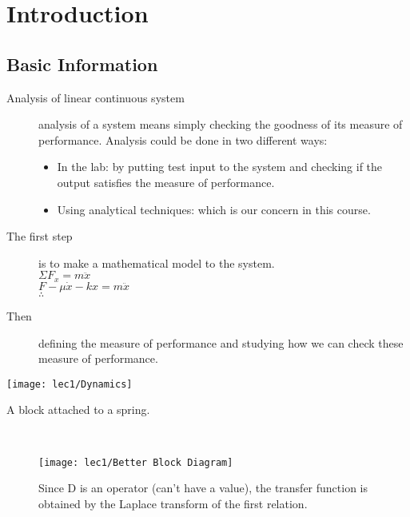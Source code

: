 \setchapterpreamble[u]{\margintoc}
\chapter[Introduction ($1^{st}$ Lecture)]{Introduction}




\section{Basic Information}

\begin{description}
	\item[Analysis of linear continuous system] analysis of a system means simply checking the goodness of its measure of performance.
Analysis could be done in two different ways:
\begin{itemize}
	\item In the lab: by putting test input to the system and checking if the output satisfies the measure of performance.
	\item Using analytical techniques: which is our concern in this course.
\end{itemize}
	\item[The first step] is to make a mathematical model to the system. \\[+1mm]
	$\Sigma F_x = m\ddot{x}$\\
	$F - \mu\dot{x} - kx = m\ddot{x}$\\
	$\therefore$
	\\[-2mm]
	\item[Then] defining the measure of performance and studying how we can check these measure of performance.
\end{description}

\begin{marginfigure}[-3cm]
		\texttt{[image: lec1/Dynamics]}
		\caption{A block attached to a spring.}
\end{marginfigure}

 \leavevmode\\[-1.6cm]
 \begin{figure}[hb]
		\raggedleft
		\texttt{[image: lec1/Better Block Diagram]}
		\caption{Since D is an operator (can't have a value),  the transfer function is obtained by the Laplace transform of the first relation.}
\end{figure}
\leavevmode\\[-1.4cm]

